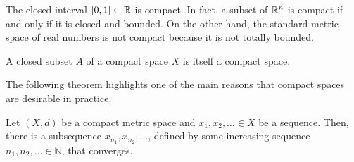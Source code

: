 The closed interval $[0,1]\subset \mathbb{R}$ is compact.
In fact, a subset of $\mathbb{R}^n$ is compact if and only if it is closed and bounded.
On the other hand, the standard metric space of real numbers is not compact because it is not totally bounded.

\begin{theorem}
\label{thm:CompactClosedSubsetCompact}
A closed subset $A$ of a compact space $X$ is itself a compact space.
\end{theorem}

The following theorem highlights one of the main reasons that compact spaces are desirable in practice.

\begin{theorem}
Let $(X,d)$ be a compact metric space and $x_1,x_2,\ldots \in X$ be a sequence.
Then, there is a subsequence $x_{n_1},x_{n_2},\ldots$, defined by some increasing sequence $n_1,n_2,\ldots \in \mathbb{N}$, that converges.
\end{theorem}
